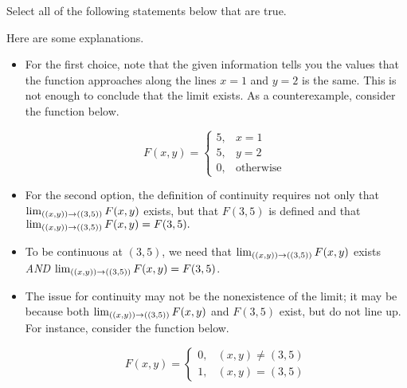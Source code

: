 \documentclass{ximera}
\author{Jim Talamo}
\begin{document}
\begin{exercise}

Select all of the following statements below that are true.

\begin{selectAll}
\end{selectAll}

\begin{feedback}[correct] 

Here are some explanations.
\begin{itemize}

\item For the first choice, note that the given information tells you the values that the function approaches along the lines $x=1$ and $y=2$ is the same.  This is not enough to conclude that the limit exists.  As a counterexample, consider the function below.

\[
F(x,y) = \begin{cases} 5, & x=1 \\ 5, & y=2 \\ 0, & \textrm{otherwise } \end{cases}
\]

\item For the second option, the definition of continuity requires not only that  $\lim_{\left((x,y)\right) \to \left((3,5)\right)} F(x,y)$ exists, but that $F(3,5)$ is defined and that $\lim_{\left((x,y)\right) \to \left((3,5)\right)} F(x,y)=F(3,5).$ 

\item To be continuous at $(3,5)$, we need that $\lim_{\left((x,y)\right) \to \left((3,5)\right)} F(x,y)$ exists \emph{AND} $\lim_{\left((x,y)\right) \to \left((3,5)\right)} F(x,y) = F(3,5)$.

\item The issue for continuity may not be the nonexistence of the limit; it may be because both $\lim_{\left((x,y)\right) \to \left((3,5)\right)} F(x,y)$ and $F(3,5)$ exist, but do not line up.  For instance, consider the function below.

\[
F(x,y) = \begin{cases} 0, & (x,y) \neq (3,5) \\ 1, & (x,y) =(3,5) \end{cases}
\]


\end{itemize}
\end{feedback}
\end{exercise}
\end{document}
